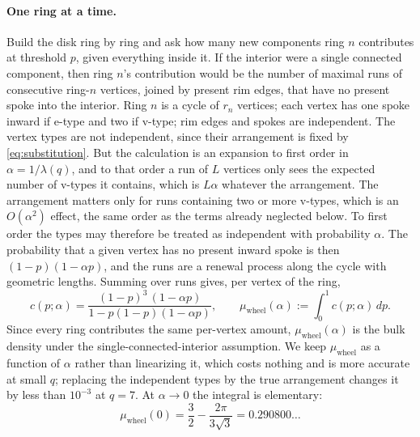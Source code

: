 \documentclass[11pt]{article}
\begin{document}
\paragraph{One ring at a time.} Build the disk ring by ring and ask how many new components ring $n$ contributes at threshold $p$, given everything inside it. If the interior were a single connected component, then ring $n$'s contribution would be the number of maximal runs of consecutive ring-$n$ vertices, joined by present rim edges, that have no present spoke into the interior. Ring $n$ is a cycle of $r_n$ vertices; each vertex has one spoke inward if e-type and two if v-type; rim edges and spokes are independent. The vertex types are not independent, since their arrangement is fixed by \eqref{eq:substitution}. But the calculation is an expansion to first order in $\alpha=1/\lambda(q)$, and to that order a run of $L$ vertices only sees the expected number of v-types it contains, which is $L\alpha$ whatever the arrangement. The arrangement matters only for runs containing two or more v-types, which is an $O(\alpha^2)$ effect, the same order as the terms already neglected below. To first order the types may therefore be treated as independent with probability $\alpha$. The probability that a given vertex has no present inward spoke is then $(1-p)(1-\alpha p)$, and the runs are a renewal process along the cycle with geometric lengths. Summing over runs gives, per vertex of the ring,
\begin{equation}
c(p;\alpha) = \frac{(1-p)^3\,(1-\alpha p)}{1-p(1-p)(1-\alpha p)},
\qquad
\mu_{\mathrm{wheel}}(\alpha) := \int_0^1 c(p;\alpha)\,dp.
\label{eq:wheel}
\end{equation}
Since every ring contributes the same per-vertex amount, $\mu_{\mathrm{wheel}}(\alpha)$ is the bulk density under the single-connected-interior assumption. We keep $\mu_{\mathrm{wheel}}$ as a function of $\alpha$ rather than linearizing it, which costs nothing and is more accurate at small $q$; replacing the independent types by the true arrangement changes it by less than $10^{-3}$ at $q=7$. At $\alpha\to0$ the integral is elementary:
\begin{equation}
\mu_{\mathrm{wheel}}(0) = \frac32 - \frac{2\pi}{3\sqrt3} = 0.290800\ldots
\label{eq:intercept}
\end{equation}
\end{document}
